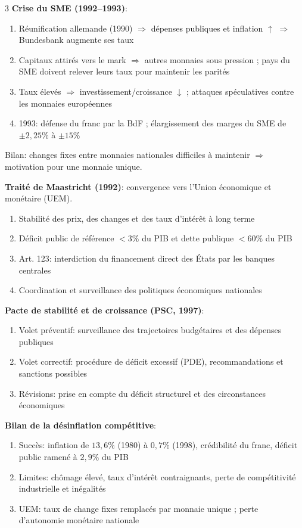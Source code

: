 \documentclass[12pt, a4paper]{article}
\begin{document}
\begin{multicols*}{3}
\textbf{Crise du SME (1992--1993)}:
\begin{enumerate}[\roman*.]
  \item Réunification allemande (1990) $\Rightarrow$ dépenses publiques et inflation $\uparrow$ $\Rightarrow$ Bundesbank augmente ses taux
  \item Capitaux attirés vers le mark $\Rightarrow$ autres monnaies sous pression ; pays du SME doivent relever leurs taux pour maintenir les parités
  \item Taux élevés $\Rightarrow$ investissement/croissance $\downarrow$ ; attaques spéculatives contre les monnaies européennes
  \item 1993: défense du franc par la BdF ; élargissement des marges du SME de $\pm2,25\%$ à $\pm15\%$
\end{enumerate}
Bilan: changes fixes entre monnaies nationales difficiles à maintenir $\Rightarrow$ motivation pour une monnaie unique.

\textbf{Traité de Maastricht (1992)}: convergence vers l'Union économique et monétaire (UEM).
\begin{enumerate}[\roman*.]
  \item Stabilité des prix, des changes et des taux d'intérêt à long terme
  \item Déficit public de référence $<3\%$ du PIB et dette publique $<60\%$ du PIB
  \item Art. 123: interdiction du financement direct des États par les banques centrales
  \item Coordination et surveillance des politiques économiques nationales
\end{enumerate}

\textbf{Pacte de stabilité et de croissance (PSC, 1997)}:
\begin{enumerate}[\roman*.]
  \item Volet préventif: surveillance des trajectoires budgétaires et des dépenses publiques
  \item Volet correctif: procédure de déficit excessif (PDE), recommandations et sanctions possibles
  \item Révisions: prise en compte du déficit structurel et des circonstances économiques
\end{enumerate}

\textbf{Bilan de la désinflation compétitive}:
\begin{enumerate}[\roman*.]
  \item Succès: inflation de $13,6\%$ (1980) à $0,7\%$ (1998), crédibilité du franc, déficit public ramené à $2,9\%$ du PIB
  \item Limites: chômage élevé, taux d'intérêt contraignants, perte de compétitivité industrielle et inégalités
  \item UEM: taux de change fixes remplacés par monnaie unique ; perte d'autonomie monétaire nationale
\end{enumerate}


\end{multicols*}
\end{document}
